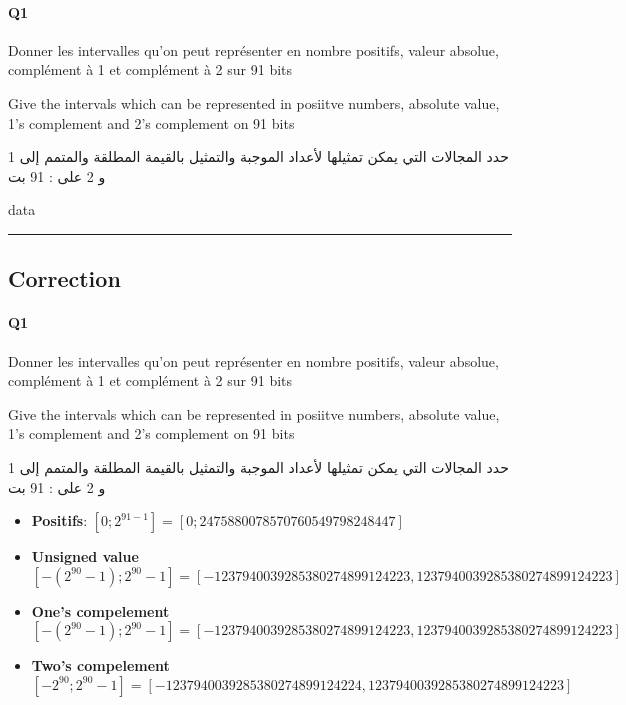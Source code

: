 \pagebreak

\paragraph{Q1}


Donner les intervalles qu'on peut représenter en nombre positifs, valeur absolue, complément à 1 et complément à 2  sur 91 bits


Give the intervals which can be represented in posiitve numbers, absolute value, 1's complement and 2's complement on 91 bits

\begin{arab}[utf]
حدد المجالات التي يمكن تمثيلها لأعداد الموجبة والتمثيل بالقيمة المطلقة والمتمم إلى 1 و 2 على   : 91 بت
\end{arab}


data


\hrule width 1\linewidth
\pagebreak

\subsection{Correction}


\paragraph{Q1}


Donner les intervalles qu'on peut représenter en nombre positifs, valeur absolue, complément à 1 et complément à 2  sur 91 bits


Give the intervals which can be represented in posiitve numbers, absolute value, 1's complement and 2's complement on 91 bits

\begin{arab}[utf]
حدد المجالات التي يمكن تمثيلها لأعداد الموجبة والتمثيل بالقيمة المطلقة والمتمم إلى 1 و 2 على   : 91 بت
\end{arab}


\begin{itemize}
\item \textbf{Positifs}: $[0; 2^{ 91-1 }] = [0; 2475880078570760549798248447]$
\item \textbf{Unsigned value} $[-(2^{ 90 }-1 );2^{ 90 }-1] = [-1237940039285380274899124223, 1237940039285380274899124223]$
\item \textbf{One's compelement} $[-(2^{ 90 }-1 );2^{ 90 }-1] = [-1237940039285380274899124223, 1237940039285380274899124223]$
\item \textbf{Two's compelement} $[-2^{ 90 } ;2^{ 90 }-1] = [-1237940039285380274899124224, 1237940039285380274899124223]$
\end{itemize}

